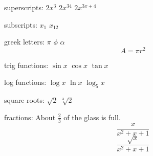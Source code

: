 \documentclass[12pt]{article}
\begin{document}
superscripts: $2x^3$ $2x^{34}$ $2x^{3x+4}$

subscripts: $x_1$ $x_{12}$

greek letters: $\pi$ $\phi$ $\alpha$
$$A = \pi r^2 $$

trig functions: $\sin{x}$ $\cos{x}$ $\tan{x}$

log functions: $\log{x}$ $\ln{x}$ $\log_5{x}$

square roots: $\sqrt{2}$ $\sqrt[3]{2}$

fractions: About $\displaystyle{\frac{2}{3}}$ of the glass is full.
$$\frac{x}{x^2+x+1}$$
$$\frac{\sqrt{x}}{x^2+x+1}$$
\end{document}
